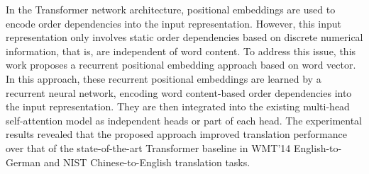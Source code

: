 In the Transformer network architecture, positional embeddings are used to encode order dependencies into the input representation. However, this input representation only involves static order dependencies based on discrete numerical information, that is, are independent of word content. To address this issue, this work proposes a recurrent positional embedding approach based on word vector. In this approach, these recurrent positional embeddings are learned by a recurrent neural network, encoding word content-based order dependencies into the input representation. They are then integrated into the existing multi-head self-attention model as independent heads or part of each head. The experimental results revealed that the proposed approach improved translation performance over that of the state-of-the-art Transformer baseline in WMT'14 English-to-German and NIST Chinese-to-English translation tasks.